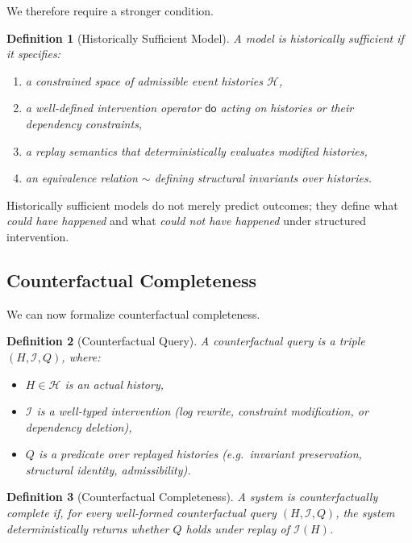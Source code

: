 \documentclass[11pt]{article}
\newtheorem{definition}{Definition}
\begin{document}
We therefore require a stronger condition.

\begin{definition}[Historically Sufficient Model]
A model is \emph{historically sufficient} if it specifies:
\begin{enumerate}
  \item a constrained space of admissible event histories $\mathcal{H}$,
  \item a well-defined intervention operator $\mathsf{do}$ acting on histories or their dependency constraints,
  \item a replay semantics that deterministically evaluates modified histories,
  \item an equivalence relation $\sim$ defining structural invariants over histories.
\end{enumerate}
\end{definition}

Historically sufficient models do not merely predict outcomes; they define what \emph{could have happened} and what \emph{could not have happened} under structured intervention.

\subsection{Counterfactual Completeness}

We can now formalize counterfactual completeness.

\begin{definition}[Counterfactual Query]
A \emph{counterfactual query} is a triple $(H,\mathcal{I},Q)$, where:
\begin{itemize}
  \item $H \in \mathcal{H}$ is an actual history,
  \item $\mathcal{I}$ is a well-typed intervention (log rewrite, constraint modification, or dependency deletion),
  \item $Q$ is a predicate over replayed histories (e.g.\ invariant preservation, structural identity, admissibility).
\end{itemize}
\end{definition}

\begin{definition}[Counterfactual Completeness]
A system is \emph{counterfactually complete} if, for every well-formed counterfactual query $(H,\mathcal{I},Q)$, the system deterministically returns whether $Q$ holds under replay of $\mathcal{I}(H)$.
\end{definition}
\end{document}
